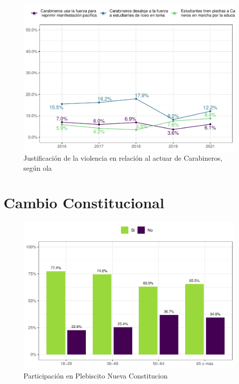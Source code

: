 \documentclass[
  12pt,
]{book}
\begin{document}
\begin{figure}

{\centering \includegraphics{reporte-elsoc_files/figure-latex/just-carab-ola-1} 

}

\caption{Justificación de la violencia en relación al actuar de Carabineros, según ola}\label{fig:just-carab-ola}
\end{figure}

\hypertarget{cambio-constitucional}{%
\chapter{Cambio Constitucional}\label{cambio-constitucional}}

\begin{figure}

{\centering \includegraphics{reporte-elsoc_files/figure-latex/particip-edad-1} 

}

\caption{Participación en Plebiscito Nueva Constitucion}\label{fig:particip-edad}
\end{figure}
\end{document}
